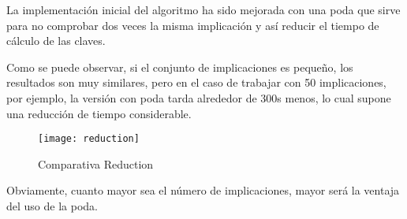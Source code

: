 La implementaci\'on inicial del algoritmo ha sido mejorada con una poda que sirve para no comprobar dos veces la misma implicaci\'on y as\'i reducir el tiempo de c\'alculo de las claves.

Como se puede observar, si el conjunto de implicaciones es peque\~no, los resultados son muy similares, pero en el caso de trabajar con 50 implicaciones, por ejemplo, la versi\'on con poda tarda alrededor de 300s menos, lo cual supone una reducci\'on de tiempo considerable.

\begin{figure}[H]
    \centering
    \texttt{[image: reduction]}
    \caption{Comparativa Reduction}
    \label{fig:reduction}
\end{figure}

Obviamente, cuanto mayor sea el n\'umero de implicaciones, mayor ser\'a la ventaja del uso de la poda.